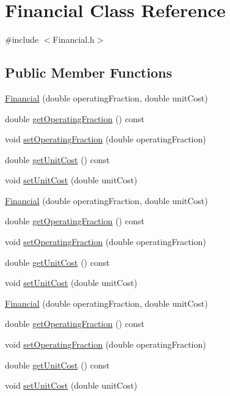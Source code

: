 \hypertarget{class_financial}{}\section{Financial Class Reference}
\label{class_financial}


{\ttfamily \#include $<$Financial.\+h$>$}

\subsection*{Public Member Functions}
\begin{DoxyCompactItemize}
\item 
\hyperlink{class_financial_abe8c4d82e9aede125e7e42ad3d53f90a}{Financial} (double operating\+Fraction, double unit\+Cost)
\item 
double \hyperlink{class_financial_a650ee2678b49d8d19b541f15d5a37c05}{get\+Operating\+Fraction} () const
\item 
void \hyperlink{class_financial_a966250111b2f7a00d797a9d153ee8a83}{set\+Operating\+Fraction} (double operating\+Fraction)
\item 
double \hyperlink{class_financial_adc3092e8f4cfd065042638236d21eaf4}{get\+Unit\+Cost} () const
\item 
void \hyperlink{class_financial_a84ead2ef72b2d348e05eb308d01e9265}{set\+Unit\+Cost} (double unit\+Cost)
\item 
\hyperlink{class_financial_abe8c4d82e9aede125e7e42ad3d53f90a}{Financial} (double operating\+Fraction, double unit\+Cost)
\item 
double \hyperlink{class_financial_a650ee2678b49d8d19b541f15d5a37c05}{get\+Operating\+Fraction} () const
\item 
void \hyperlink{class_financial_a966250111b2f7a00d797a9d153ee8a83}{set\+Operating\+Fraction} (double operating\+Fraction)
\item 
double \hyperlink{class_financial_adc3092e8f4cfd065042638236d21eaf4}{get\+Unit\+Cost} () const
\item 
void \hyperlink{class_financial_a84ead2ef72b2d348e05eb308d01e9265}{set\+Unit\+Cost} (double unit\+Cost)
\item 
\hyperlink{class_financial_abe8c4d82e9aede125e7e42ad3d53f90a}{Financial} (double operating\+Fraction, double unit\+Cost)
\item 
double \hyperlink{class_financial_a650ee2678b49d8d19b541f15d5a37c05}{get\+Operating\+Fraction} () const
\item 
void \hyperlink{class_financial_a966250111b2f7a00d797a9d153ee8a83}{set\+Operating\+Fraction} (double operating\+Fraction)
\item 
double \hyperlink{class_financial_adc3092e8f4cfd065042638236d21eaf4}{get\+Unit\+Cost} () const
\item 
void \hyperlink{class_financial_a84ead2ef72b2d348e05eb308d01e9265}{set\+Unit\+Cost} (double unit\+Cost)
\end{DoxyCompactItemize}



